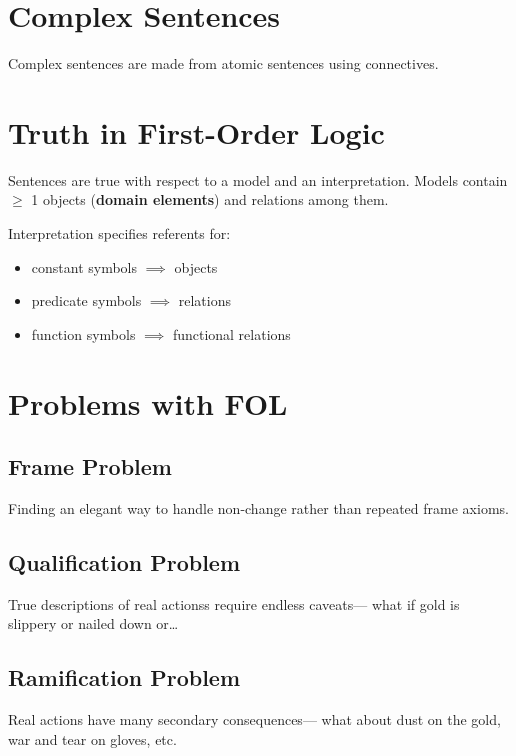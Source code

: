 \documentclass[11pt]{article}
\begin{document}
\section{Complex Sentences}
\label{sec:org3588f15}
Complex sentences are made from atomic sentences using connectives.

\section{Truth in First-Order Logic}
\label{sec:org4974a21}
Sentences are true with respect to a model and an interpretation.
Models contain \(\ge\) 1 objects (\textbf{domain elements}) and relations among them.

Interpretation specifies referents for:
\begin{itemize}
\item constant symbols \(\implies\) objects
\item predicate symbols \(\implies\) relations
\item function symbols \(\implies\) functional relations
\end{itemize}

\section{Problems with FOL}
\label{sec:org577f47b}
\subsection{Frame Problem}
\label{sec:org0414a7a}
Finding an elegant way to handle non-change rather than repeated frame axioms.

\subsection{Qualification Problem}
\label{sec:orgf0b48af}
True descriptions of real actionss require endless caveats--- what if gold is slippery or nailed down or\ldots{}

\subsection{Ramification Problem}
\label{sec:org76e5a39}
Real actions have many secondary consequences--- what about dust on the gold, war and tear on gloves, etc.
\end{document}
